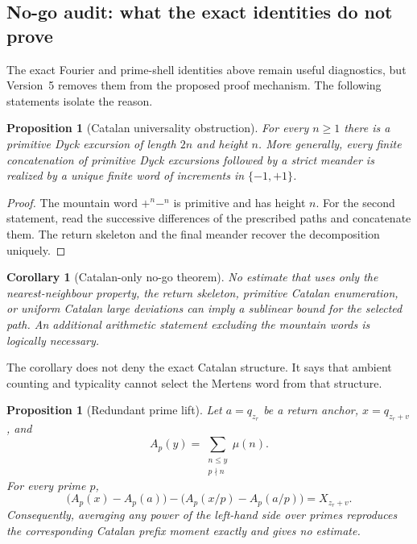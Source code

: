 \documentclass[11pt]{amsart}
\numberwithin{equation}{section}
\theoremstyle{plain}
\newtheorem{proposition}[theorem]{Proposition}
\newtheorem{corollary}[theorem]{Corollary}
\theoremstyle{definition}
\theoremstyle{remark}
\newcommand{\Mob}{\mu}
\begin{document}
\subsection{No-go audit: what the exact identities do not prove}

The exact Fourier and prime-shell identities above remain useful diagnostics,
but Version~5 removes them from the proposed proof mechanism.  The following
statements isolate the reason.

\begin{proposition}[Catalan universality obstruction]
\label{prop:catalan_universality_obstruction}
For every $n\geq1$ there is a primitive Dyck excursion of length $2n$ and
height $n$.  More generally, every finite concatenation of primitive Dyck
excursions followed by a strict meander is realized by a unique finite word
of increments in $\{-1,+1\}$.
\end{proposition}

\begin{proof}
The mountain word $+^n-^n$ is primitive and has height $n$.  For the second
statement, read the successive differences of the prescribed paths and
concatenate them.  The return skeleton and the final meander recover the
decomposition uniquely.
\end{proof}

\begin{corollary}[Catalan-only no-go theorem]
\label{cor:catalan_only_no_go}
No estimate that uses only the nearest-neighbour property, the return
skeleton, primitive Catalan enumeration, or uniform Catalan large deviations
can imply a sublinear bound for the selected path.  An additional arithmetic
statement excluding the mountain words is logically necessary.
\end{corollary}

The corollary does not deny the exact Catalan structure.  It says that ambient
counting and typicality cannot select the Mertens word from that structure.

\begin{proposition}[Redundant prime lift]
\label{prop:redundant_prime_lift}
Let $a=q_{z_r}$ be a return anchor, $x=q_{z_r+v}$, and
\begin{equation}
A_p(y)=\sum_{\substack{n\leq y\\p\nmid n}}\Mob(n).
\end{equation}
For every prime $p$,
\begin{equation}
\bigl(A_p(x)-A_p(a)\bigr)
-\bigl(A_p(x/p)-A_p(a/p)\bigr)
=X_{z_r+v}.
\label{eq:redundant_prime_lift}
\end{equation}
Consequently, averaging any power of the left-hand side over primes reproduces
the corresponding Catalan prefix moment exactly and gives no estimate.
\end{proposition}
\end{document}

